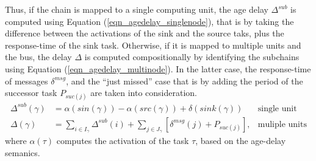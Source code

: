 Thus, if the chain is mapped to a single computing unit, the age delay  $\Delta^{sub}$ is computed using Equation (\ref{eqn_agedelay_singlenode}), that is by taking the difference between the activations of the sink and the source taks, plus the response-time of the sink task. Otherwise, if it is mapped to multiple units and the bus, the delay $\Delta$ is computed compositionally by identifying the subchains using Equation (\ref{eqn_agedelay_multinode}). In the latter case, the response-time of messages $\delta^{msg}$, and the ``just missed'' case that is by adding the period of the successor task $P_{suc(j)}$ are  taken into consideration. 
\begin{align}
	\label{eqn_agedelay_singlenode}
	\Delta^{sub}(\gamma) &= \alpha(sin(\gamma))-\alpha(src(\gamma)) + \delta(sink(\gamma)) & \text{single unit}\\
	\label{eqn_agedelay_multinode}
	\Delta(\gamma)&=\sum_{i\in I_{\gamma}}{\Delta^{sub}(i)} + \sum_{j\in  J_{\gamma}}{[\delta^{msg}(j)+P_{suc(j)}]}, &\text{muliple units}
\end{align}
where $\alpha(\tau)$ computes the activation of the task $\tau$, based on the age-delay semanics.


